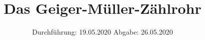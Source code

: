 

\subject{V703}
\title{Das Geiger-Müller-Zählrohr}
\date{%
  Durchführung: 19.05.2020
  \hspace{3em}
  Abgabe: 26.05.2020
}



\maketitle
\thispagestyle{empty}
\tableofcontents
\newpage







\printbibliography{}


